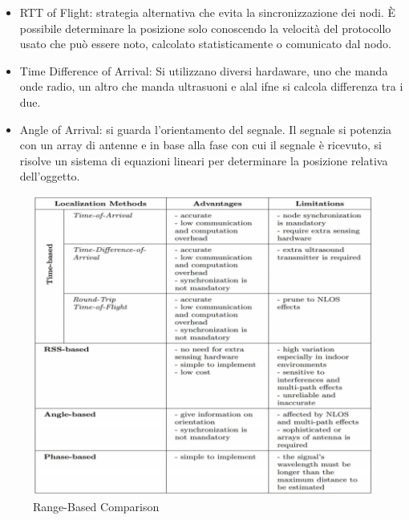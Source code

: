 \documentclass[12pt,a4paper]{article}
\begin{document}
\begin{itemize}
		\item RTT of Flight: strategia alternativa che evita la sincronizzazione dei nodi. È possibile determinare la posizione solo conoscendo la velocità del protocollo usato che può essere noto, calcolato statisticamente o comunicato dal nodo.
		\item Time Difference of Arrival: Si utilizzano diversi hardaware, uno che manda onde radio, un altro che manda ultrasuoni e alal ifne si calcola differenza tra i due.
		\item Angle of Arrival: si guarda l'orientamento del segnale. Il segnale si potenzia con un array di antenne e in base alla fase con cui il segnale è ricevuto, si risolve un sistema di equazioni lineari per determinare la posizione relativa dell'oggetto. 
	\end{itemize}
	\begin{figure}
		\centering
		\includegraphics[scale=0.8]{fig4-lec3pt1.png}
		\caption{Range-Based Comparison}
		\label{fig:fig4-lec3pt1}
	\end{figure}
	
	\newpage
	
\end{document}

